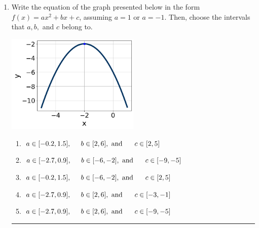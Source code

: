 \documentclass[14pt]{extbook}
\newcommand{\litem}[1]{\item#1\hspace*{-1cm}\rule{\textwidth}{0.4pt}}
\begin{document}
\begin{enumerate}
{\begin{enumerate}[label=\Alph*.]
\end{enumerate} }
\litem{
Write the equation of the graph presented below in the form $f(x)=ax^2+bx+c$, assuming  $a=1$ or $a=-1$. Then, choose the intervals that $a, b,$ and $c$ belong to.
\begin{center}
    \includegraphics[width=0.5\textwidth]{../Figures/quadraticGraphToEquationA.png}
\end{center}
\begin{enumerate}[label=\Alph*.]
\item \( a \in [-0.2, 1.5], \hspace*{5mm} b \in [2, 6], \text{ and } \hspace*{5mm} c \in [2, 5] \)
\item \( a \in [-2.7, 0.9], \hspace*{5mm} b \in [-6, -2], \text{ and } \hspace*{5mm} c \in [-9, -5] \)
\item \( a \in [-0.2, 1.5], \hspace*{5mm} b \in [-6, -2], \text{ and } \hspace*{5mm} c \in [2, 5] \)
\item \( a \in [-2.7, 0.9], \hspace*{5mm} b \in [2, 6], \text{ and } \hspace*{5mm} c \in [-3, -1] \)
\item \( a \in [-2.7, 0.9], \hspace*{5mm} b \in [2, 6], \text{ and } \hspace*{5mm} c \in [-9, -5] \)

\end{enumerate} }
\end{enumerate}
\end{document}
